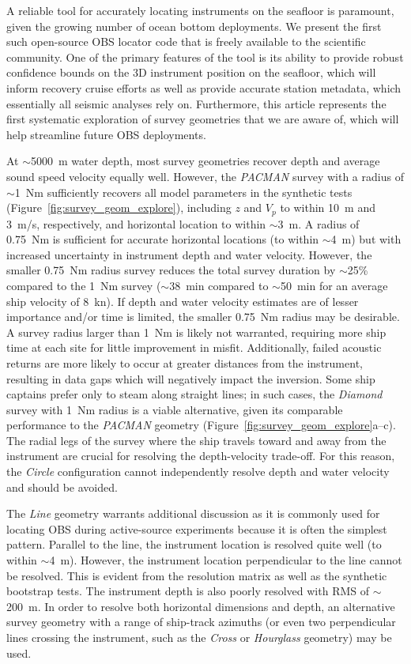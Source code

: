 A reliable tool for accurately locating instruments on the seafloor is paramount, given the growing number of ocean bottom deployments. We present the first such open-source OBS locator code that is freely available to the scientific community. One of the primary features of the tool is its ability to provide robust confidence bounds on the 3D instrument position on the seafloor, which will inform recovery cruise efforts as well as provide accurate station metadata, which essentially all seismic analyses rely on. Furthermore, this article represents the first systematic exploration of survey geometries that we are aware of, which will help streamline future OBS deployments.

At $\sim$5000~m water depth, most survey geometries recover depth and average sound speed velocity equally well. However, the \textit{PACMAN} survey with a radius of $\sim$1~Nm sufficiently recovers all model parameters in the synthetic tests (Figure~\ref{fig:survey_geom_explore}), including $z$ and $V_p$ to within 10~m and 3~m/s, respectively, and horizontal location to within $\sim$3~m. A radius of 0.75~Nm is sufficient for accurate horizontal locations (to within $\sim$4~m) but with increased uncertainty in instrument depth and water velocity. However, the smaller 0.75~Nm radius survey reduces the total survey duration by $\sim$25\% compared to the 1~Nm survey ($\sim$38~min compared to $\sim$50~min for an average ship velocity of 8~kn). If depth and water velocity estimates are of lesser importance and/or time is limited, the smaller 0.75~Nm radius may be desirable. A survey radius larger than 1~Nm is likely not warranted, requiring more ship time at each site for little improvement in misfit. Additionally, failed acoustic returns are more likely to occur at greater distances from the instrument, resulting in data gaps which will negatively impact the inversion. Some ship captains prefer only to steam along straight lines; in such cases, the \textit{Diamond} survey with 1~Nm radius is a viable alternative, given its comparable performance to the \textit{PACMAN} geometry (Figure~\ref{fig:survey_geom_explore}a--c). The radial legs of the survey where the ship travels toward and away from the instrument are crucial for resolving the depth-velocity trade-off. For this reason, the \textit{Circle} configuration cannot independently resolve depth and water velocity and should be avoided.

The \textit{Line} geometry warrants additional discussion as it is commonly used for locating OBS during active-source experiments because it is often the simplest pattern. Parallel to the line, the instrument location is resolved quite well (to within $\sim$4~m). However, the instrument location perpendicular to the line cannot be resolved. This is evident from the resolution matrix as well as the synthetic bootstrap tests. The instrument depth is also poorly resolved with RMS of $\sim$200~m. In order to resolve both horizontal dimensions and depth, an alternative survey geometry with a range of ship-track azimuths (or even two perpendicular lines crossing the instrument, such as the \textit{Cross} or \textit{Hourglass} geometry) may be used.

